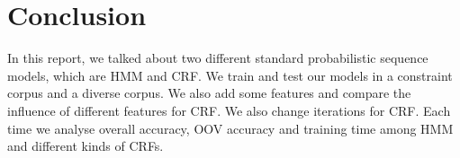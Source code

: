 \documentclass[journal, a4paper]{IEEEtran}
\begin{document}
\section{Conclusion}\label{conclude}
	In this report, we talked about two different standard probabilistic sequence models, which are HMM and CRF. We train and test our models in a constraint corpus and a diverse corpus. We also add some features and compare the influence of different features for CRF. We also change iterations for CRF. Each time we analyse overall accuracy, OOV accuracy and training time among HMM and different kinds of CRFs.
	

\end{document}
